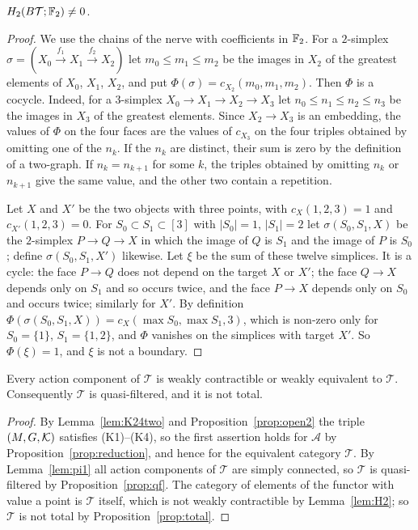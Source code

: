 \begin{lemma}\label{lem:H2}
$H_2(B\mathcal T;\mathbb{F}_2)\ne 0$.
\end{lemma}

\begin{proof}
We use the chains of the nerve with coefficients in $\mathbb{F}_2$. For a
$2$-simplex $\sigma=(X_0\xrightarrow{f_1}X_1\xrightarrow{f_2}X_2)$ let
$m_0\le m_1\le m_2$ be the images in $X_2$ of the greatest elements of $X_0$,
$X_1$, $X_2$, and put $\Phi(\sigma)=c_{X_2}(m_0,m_1,m_2)$. Then $\Phi$ is a
cocycle. Indeed, for a $3$-simplex $X_0\to X_1\to X_2\to X_3$ let
$n_0\le n_1\le n_2\le n_3$ be the images in $X_3$ of the greatest elements.
Since $X_2\to X_3$ is an embedding, the values of $\Phi$ on the four faces are
the values of $c_{X_3}$ on the four triples obtained by omitting one of the
$n_k$. If the $n_k$ are distinct, their sum is zero by the definition of a
two-graph. If $n_k=n_{k+1}$ for some $k$, the triples obtained by omitting
$n_k$ or $n_{k+1}$ give the same value, and the other two contain a
repetition.

Let $X$ and $X'$ be the two objects with three points, with
$c_X(1,2,3)=1$ and $c_{X'}(1,2,3)=0$. For $S_0\subset S_1\subset[3]$ with
$|S_0|=1$, $|S_1|=2$ let $\sigma(S_0,S_1,X)$ be the $2$-simplex
$P\to Q\to X$ in which the image of $Q$ is $S_1$ and the image of $P$ is
$S_0$; define $\sigma(S_0,S_1,X')$ likewise. Let $\xi$ be the sum of these
twelve simplices. It is a cycle: the face $P\to Q$ does not depend on the
target $X$ or $X'$; the face $Q\to X$ depends only on $S_1$ and so occurs
twice, and the face $P\to X$ depends only on $S_0$ and occurs twice; similarly
for $X'$. By definition $\Phi(\sigma(S_0,S_1,X))=c_X(\max S_0,\max S_1,3)$,
which is non-zero only for $S_0=\{1\}$, $S_1=\{1,2\}$, and $\Phi$ vanishes on
the simplices with target $X'$. So $\Phi(\xi)=1$, and $\xi$ is not a boundary.
\end{proof}

\begin{theorem}\label{thm:twographs}
Every action component of $\mathcal T$ is weakly contractible or weakly
equivalent to $\mathcal T$. Consequently $\mathcal T$ is quasi-filtered, and
it is not total.
\end{theorem}

\begin{proof}
By Lemma~\ref{lem:K24two} and Proposition~\ref{prop:open2} the triple
$(M,G,\mathcal{K})$ satisfies (K1)--(K4), so the first assertion holds for $\mathcal A$
by Proposition~\ref{prop:reduction}, and hence for the equivalent category
$\mathcal T$. By Lemma~\ref{lem:pi1} all action components of $\mathcal T$ are
simply connected, so $\mathcal T$ is quasi-filtered by
Proposition~\ref{prop:qf}. The category of elements of the functor with value
a point is $\mathcal T$ itself, which is not weakly contractible by
Lemma~\ref{lem:H2}; so $\mathcal T$ is not total by
Proposition~\ref{prop:total}.
\end{proof}

